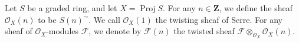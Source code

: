 Let $S$ be a graded ring, and let $X = \operatorname{Proj} S$. For any $n \in \mathbf{Z}$, we define the sheaf $\mathcal{O}_X(n)$ to be $S(n)^{\sim}$. We call $\mathcal{O}_X(1)$ the twisting sheaf of Serre. For any sheaf of $\mathcal{O}_X$-modules $\mathcal{F}$, we denote by $\mathcal{F}(n)$ the twisted sheaf $\mathcal{F} \otimes_{\mathcal{O}_X} \mathcal{O}_X(n)$.
